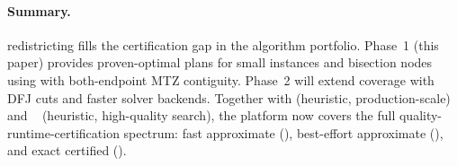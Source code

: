 \paragraph{Summary.}
\ilp{} redistricting fills the certification gap in the algorithm
portfolio.
Phase~1 (this paper) provides proven-optimal plans for small instances
and bisection nodes using \glpk{} with both-endpoint MTZ contiguity.
Phase~2 will extend coverage with DFJ cuts and faster solver backends.
Together with \metis{} (heuristic, production-scale) and
\be{}~\citep{dellaLibera2026comparison} (heuristic, high-quality search),
the platform now covers the full quality-runtime-certification spectrum:
fast approximate (\metis{}), best-effort approximate (\be{}), and
exact certified (\ilp{}).
